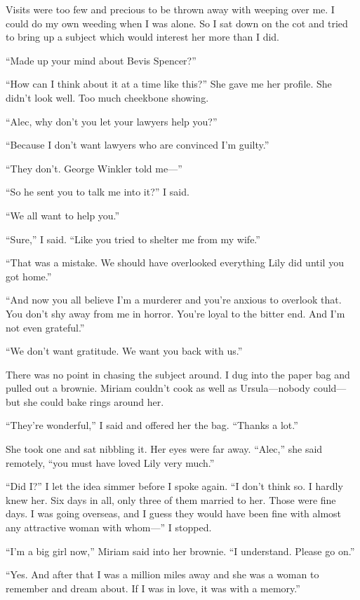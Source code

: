 \documentclass{novel}
\begin{document}
Visits were too few and precious to be thrown away with weeping over me. I could do my own weeding when I was alone. So I sat down on the cot and tried to bring up a subject which would interest her more than I did.

“Made up your mind about Bevis Spencer?”

“How can I think about it at a time like this?” She gave me her profile. She didn’t look well. Too much cheekbone showing. 

“Alec, why don’t you let your lawyers help you?”

“Because I don’t want lawyers who are convinced I’m guilty.”

“They don’t. George Winkler told me—”

“So he sent you to talk me into it?” I said.

“We all want to help you.”

“Sure,” I said. “Like you tried to shelter me from my wife.”

“That was a mistake. We should have overlooked everything Lily did until you got home.”

“And now you all believe I’m a murderer and you’re anxious to overlook that. You don’t shy away from me in horror. You’re loyal to the bitter end. And I’m not even grateful.”

“We don’t want gratitude. We want you back with us.”

There was no point in chasing the subject around. I dug into the paper bag and pulled out a brownie. Miriam couldn’t cook as well as Ursula—nobody could—but she could bake rings around her. 

“They’re wonderful,” I said and offered her the bag. “Thanks a lot.”

She took one and sat nibbling it. Her eyes were far away. “Alec,” she said remotely, “you must have loved Lily very much.”

“Did I?” I let the idea simmer before I spoke again. “I don’t think so. I hardly knew her. Six days in all, only three of them married to her. Those were fine days. I was going overseas, and I guess they would have been fine with almost any attractive woman with whom—” I stopped.

“I’m a big girl now,” Miriam said into her brownie. “I understand. Please go on.”

“Yes. And after that I was a million miles away and she was a woman to remember and dream about. If I was in love, it was with a memory.”
\end{document}

